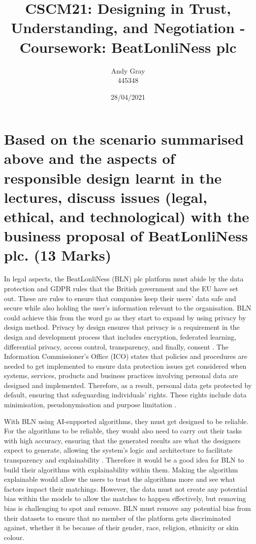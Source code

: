 \documentclass[a4paper,10pt]{article}
\begin{document}
\title{CSCM21: Designing in Trust, Understanding, and Negotiation - Coursework: BeatLonliNess plc}
\author{Andy Gray\\445348}
\date{28/04/2021}

\maketitle

\section{Based on the scenario summarised above and the aspects of responsible design learnt in the lectures, discuss issues (legal, ethical, and technological) with the business proposal of BeatLonliNess plc. (13 Marks)}
\label{sec:intro}

In legal aspects, the BeatLonliNess (BLN) plc platform must abide by the data protection and GDPR rules that the British government and the EU have set out. These are rules to ensure that companies keep their users' data safe and secure while also holding the user's information relevant to the organisation. BLN could achieve this from the word go as they start to expand by using privacy by design method. Privacy by design ensures that privacy is a requirement in the design and development process that includes encryption, federated learning, differential privacy, access control, transparency, and finally, consent \cite{berte_slides_ai_law_overview}. The Information Commissioner's Office (ICO) states that policies and procedures are needed to get implemented to ensure data protection issues get considered when systems, services, products and business practices involving personal data are designed and implemented. Therefore, as a result, personal data gets protected by default, ensuring that safeguarding individuals' rights. These rights include data minimisation, pseudonymisation and purpose limitation \cite{ico_website}. 

With BLN using AI-supported algorithms, they must get designed to be reliable. For the algorithms to be reliable, they would also need to carry out their tasks with high accuracy, ensuring that the generated results are what the designers expect to generate, allowing the system's logic and architecture to facilitate transparency and explainability \cite{adam_slides_regulating_ai}. Therefore it would be a good idea for BLN to build their algorithms with explainability within them. Making the algorithm explainable would allow the users to trust the algorithms more and see what factors impact their matchings. However, the data must not create any potential bias within the models to allow the matches to happen effectively, but removing bias is challenging to spot and remove. BLN must remove any potential bias from their datasets to ensure that no member of the platform gets discriminated against, whether it be because of their gender, race, religion, ethnicity or skin colour. 
\end{document}
